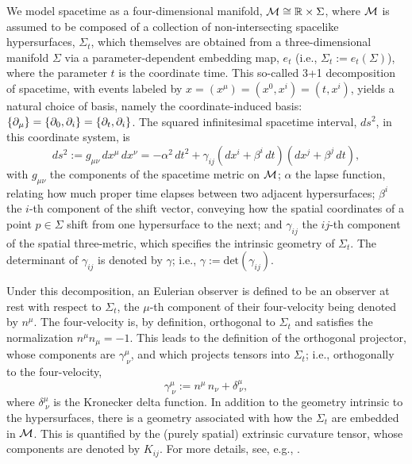 We model spacetime as a four-dimensional manifold,
$\mathcal{M}\cong\mathbb{R}\times\Sigma$, where $\mathcal{M}$ is assumed to be composed
of a collection of non-intersecting spacelike hypersurfaces, $\Sigma_{t}$,
which themselves are obtained from a three-dimensional manifold $\Sigma$ via a
parameter-dependent embedding map,
$e_{t}$ (i.e., $\Sigma_{t}:=e_{t}\left(\Sigma\right)$),
where the parameter $t$ is the coordinate time.
This so-called 3+1 decomposition of spacetime, with events labeled by
$x=\left(x^{\mu}\right)=\left(x^{0},x^{i}\right)=\left(t,x^{i}\right)$,
yields a natural choice of
basis, namely the coordinate-induced basis:
$\left\{\partial_{\mu}\right\}=\left\{\partial_{0},\partial_{i}\right\}
=\left\{\partial_{t},\partial_{i}\right\}$.
The squared infinitesimal spacetime interval, $ds^{2}$, in this coordinate
system, is
\begin{equation}
  ds^{2}:=g_{\mu\nu}\,dx^{\mu}\,dx^{\nu}=-\alpha^{2}\,dt^{2}
  +\gamma_{ij}\left(dx^{i}+\beta^{i}\,dt\right)
  \left(dx^{j}+\beta^{j}\,dt\right),
\end{equation}
with $g_{\mu\nu}$ the components
of the spacetime metric on $\mathcal{M}$;
$\alpha$ the lapse function,
relating how much proper time elapses between two adjacent hypersurfaces;
$\beta^{i}$ the $i$-th component of the shift vector,
conveying how the spatial coordinates of a
point $p\in\Sigma$ shift from one hypersurface to the next;
and $\gamma_{ij}$ the $ij$-th component of
the spatial three-metric, which specifies the intrinsic geometry of
$\Sigma_{t}$.
The determinant of $\gamma_{ij}$ is denoted by $\gamma$; i.e.,
$\gamma:=\mathrm{det}\left(\gamma_{ij}\right)$.

Under this decomposition, an Eulerian observer is defined to be an
observer at rest with respect to $\Sigma_{t}$, the $\mu$-th component of their
four-velocity being denoted by $n^{\mu}$.
The four-velocity is, by definition, orthogonal to $\Sigma_{t}$ and satisfies
the normalization $n^{\mu}n_{\mu}=-1$.
This leads to the definition of the orthogonal projector,
whose components are $\gamma^{\mu}_{~\nu}$,
and which projects tensors into $\Sigma_{t}$;
i.e., orthogonally to the four-velocity,
\begin{equation}
  \gamma^{\mu}_{~\nu}:=n^{\mu}\,n_{\nu}+\delta^{\mu}_{~\nu},
\end{equation}
where $\delta^{\mu}_{~\nu}$ is the Kronecker delta function.
In addition to the geometry intrinsic to the hypersurfaces, there is a geometry
associated with how the $\Sigma_{t}$ are embedded in $\mathcal{M}$.
This is quantified by the (purely spatial) extrinsic curvature tensor,
whose components are denoted by $K_{ij}$.
For more details, see, e.g., \citet{bs2010,g2012,rz2013}.

